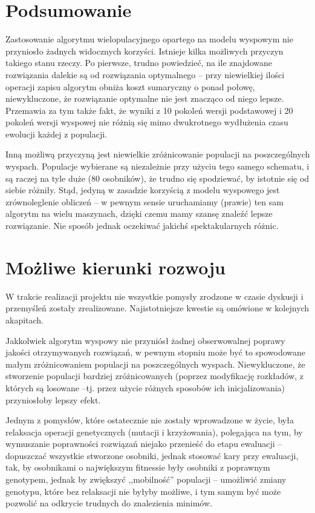 \documentclass[11pt,pdftex,a4paper]{scrartcl}
\begin{document}
\section{Podsumowanie}

Zastosowanie algorytmu wielopulacyjnego opartego na modelu wyspowym nie przyniosło żadnych widocznych
korzyści. Istnieje kilka możliwych przyczyn takiego stanu rzeczy. Po pierwsze, trudno powiedzieć, na
ile znajdowane rozwiązania dalekie są od rozwiązania optymalnego -- przy niewielkiej ilości operacji
zapisu algorytm obniża koszt sumaryczny o ponad połowę, niewykluczone, że rozwiązanie optymalne nie
jest znacząco od niego lepsze. Przemawia za tym także fakt, że wyniki z 10 pokoleń wersji podstawowej
i 20 pokoleń wersji wyspowej nie różnią się mimo dwukrotnego wydłużenia czasu ewolucji każdej z
populacji.

Inną możliwą przyczyną jest niewielkie zróżnicowanie populacji na poszczególnych wyspach. Populacje
wybierane są niezależnie przy użyciu tego samego schematu, i są raczej na tyle duże (80 osobników),
że trudno się spodziewać, by istotnie się od siebie różniły. Stąd, jedyną w zasadzie korzyścią z modelu
wyspowego jest zrównoleglenie obliczeń -- w pewnym sensie uruchamiamy (prawie) ten sam algorytm
na wielu maszynach, dzięki czemu mamy szansę znaleźć lepsze rozwiązanie. Nie sposób jednak oczekiwać
jakichś spektakularnych różnic.


\section{Możliwe kierunki rozwoju}

W trakcie realizacji projektu nie wszystkie pomysły zrodzone w czasie dyskusji i przemyśleń zostały
zrealizowane. Najistotniejsze kwestie są omówione w kolejnych akapitach.

Jakkolwiek algorytm wyspowy nie przyniósł żadnej obserwowalnej poprawy jakości otrzymywanych rozwiązań,
w pewnym stopniu może być to spowodowane małym zróżnicowaniem populacji na poszczególnych wyspach.
Niewykluczone, że stworzenie populacji bardziej zróżnicowanych (poprzez modyfikację rozkładów, z których
są losowane --tj. przez użycie różnych sposobów ich inicjalizowania) przyniosłoby lepszy efekt.

Jednym z pomysłów, które ostatecznie nie zostały wprowadzone w życie, była relaksacja operacji
genetycznych (mutacji i krzyżowania), polegająca na tym, by wymuszanie poprawności rozwiązań niejako
przenieść do etapu ewaluacji -- dopuszczać wszystkie stworzone osobniki, jednak stosować kary przy
ewaluacji, tak, by osobnikami o największym fitnessie były osobniki z poprawnym genotypem, jednak by
zwiększyć ,,mobilność'' populacji -- umożliwić zmiany genotypu, które bez relaksacji nie byłyby 
możliwe, i tym samym być może pozwolić na odkrycie trudnych do znalezienia minimów.
\end{document}
